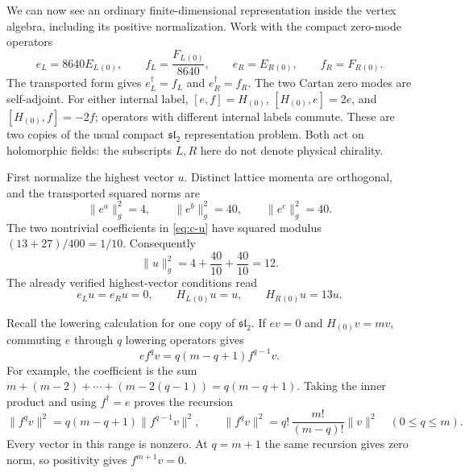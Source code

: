 \begin{example}
\label{ex:c-current-multiplet}
We can now see an ordinary finite-dimensional representation inside the
vertex algebra, including its positive normalization. Work with the
compact zero-mode operators
\[
 e_L=8640E_L{}_{(0)},\qquad f_L=\frac{F_L{}_{(0)}}{8640},
 \qquad e_R=E_R{}_{(0)},\qquad f_R=F_R{}_{(0)}.
\]
The transported form gives $e_L^\dagger=f_L$ and
$e_R^\dagger=f_R$. The two Cartan zero modes are self-adjoint.
For either internal label, $[e,f]=H_{(0)}$,
$[H_{(0)},e]=2e$, and $[H_{(0)},f]=-2f$; operators with different
internal labels commute. These are two copies of the usual compact
$\mathfrak{sl}_2$ representation problem. Both act on holomorphic
fields: the subscripts $L,R$ here do not denote physical chirality.

First normalize the highest vector $u$. Distinct lattice momenta are
orthogonal, and the transported squared norms are
\[
 \|e^a\|_g^2=4,\qquad \|e^b\|_g^2=40,
 \qquad \|e^c\|_g^2=40.
\]
The two nontrivial coefficients in \eqref{eq:c-u} have squared modulus
$(13+27)/400=1/10$. Consequently
\[
 \|u\|_g^2=4+\frac{40}{10}+\frac{40}{10}=12.
\]
The already verified highest-vector conditions read
\[
 e_Lu=e_Ru=0,\qquad H_L{}_{(0)}u=u,
 \qquad H_R{}_{(0)}u=13u.
\]

Recall the lowering calculation for one copy of $\mathfrak{sl}_2$.
If $ev=0$ and $H_{(0)}v=mv$, commuting $e$ through $q$ lowering
operators gives
\[
 ef^qv=q(m-q+1)f^{q-1}v.
\]
For example, the coefficient is the sum
$m+(m-2)+\cdots+(m-2(q-1))=q(m-q+1)$.
Taking the inner product and using $f^\dagger=e$ proves the recursion
\[
 \|f^qv\|^2=q(m-q+1)\|f^{q-1}v\|^2,
 \qquad
 \|f^qv\|^2=q!\,\frac{m!}{(m-q)!}\|v\|^2
 \quad(0\le q\le m).
\]
Every vector in this range is nonzero. At $q=m+1$ the same recursion
gives zero norm, so positivity gives $f^{m+1}v=0$.


\end{example}
